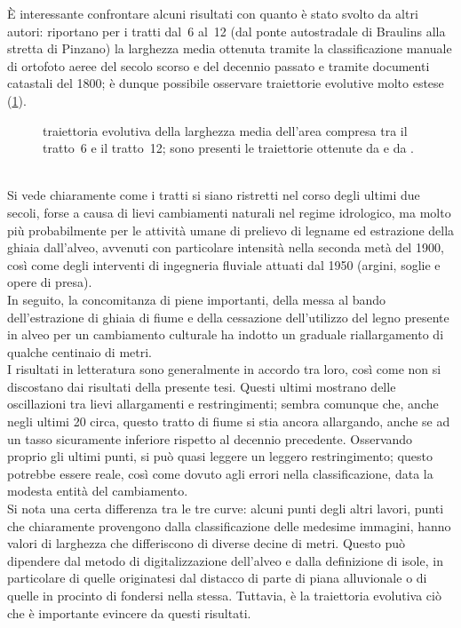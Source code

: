 È interessante confrontare alcuni risultati con quanto è stato svolto da altri autori:  riportano per i tratti dal~6 al~12 (dal ponte autostradale di Braulins alla stretta di Pinzano) la larghezza media ottenuta tramite la classificazione manuale di ortofoto aeree del secolo scorso e del decennio passato e tramite documenti catastali del 1800; è dunque possibile osservare traiettorie evolutive molto estese (\cref{graph:larghezze-vs-letteratura}).
%
\begin{figure}
	\centering
	
	\caption[traiettoria evolutiva della larghezza media dell'area compresa tra il tratto~6 e il tratto~12]{traiettoria evolutiva della larghezza media dell'area compresa tra il tratto~6 e il tratto~12; sono presenti le traiettorie ottenute da  e da .}
	\label{graph:larghezze-vs-letteratura}
\end{figure}
%
\\
Si vede chiaramente come i tratti si siano ristretti nel corso degli ultimi due secoli, forse a causa di lievi cambiamenti naturali nel regime idrologico, ma molto più probabilmente per le attività umane di prelievo di legname ed estrazione della ghiaia dall'alveo, avvenuti con particolare intensità nella seconda metà del 1900, così come degli interventi di ingegneria fluviale attuati dal 1950 (argini, soglie e opere di presa).
\\
In seguito, la concomitanza di piene importanti, della messa al bando dell'estrazione di ghiaia di fiume e della cessazione dell'utilizzo del legno presente in alveo per un cambiamento culturale ha indotto un graduale riallargamento di qualche centinaio di metri.
\\
I risultati in letteratura sono generalmente in accordo tra loro, così come non si discostano dai risultati della presente tesi.
Questi ultimi mostrano delle oscillazioni tra lievi allargamenti e restringimenti; sembra comunque che, anche negli ultimi \SI{20}{\anni} circa, questo tratto di fiume si stia ancora allargando, anche se ad un tasso sicuramente inferiore rispetto al decennio precedente.
Osservando proprio gli ultimi punti, si può quasi leggere un leggero restringimento; questo potrebbe essere reale, così come dovuto agli errori nella classificazione, data la modesta entità del cambiamento.
\\
Si nota una certa differenza tra le tre curve: alcuni punti degli altri lavori, punti che chiaramente provengono dalla classificazione delle medesime immagini, hanno valori di larghezza che differiscono di diverse decine di metri.
Questo può dipendere dal metodo di digitalizzazione dell'alveo e dalla definizione di isole, in particolare di quelle originatesi dal distacco di parte di piana alluvionale o di quelle in procinto di fondersi nella stessa.
Tuttavia, è la traiettoria evolutiva ciò che è importante evincere da questi risultati.
